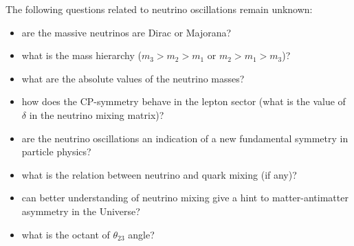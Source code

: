 The following questions related to neutrino oscillations remain unknown: 
\begin{itemize}
  \item are the massive neutrinos are Dirac or Majorana?
  \item what is the mass hierarchy ($m_3>m_2>m_1$ or $m_2>m_1>m_3$)?
  \item what are the absolute values of the neutrino masses?
  \item how does the CP-symmetry behave in the lepton sector (what is the value of $\delta$ in the neutrino mixing matrix)?
  \item are the neutrino oscillations an indication of a new fundamental symmetry in particle physics?
  \item what is the relation between neutrino and quark mixing (if any)?
  \item can better understanding of neutrino mixing give a hint to matter-antimatter asymmetry in the Universe?
  \item what is the octant of $\theta_{23}$ angle?
\end{itemize} 
